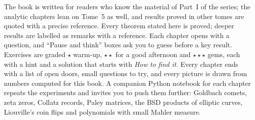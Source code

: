 The book is written for readers who know the material of Part~I of the series; the analytic chapters lean on
Tome~5 as well, and results proved in other tomes are quoted with a precise reference. Every theorem stated here
is proved; deeper results are labelled as remarks with a reference. Each chapter opens with a question, and
``Pause and think'' boxes ask you to guess before a key result. Exercises are graded \textbf{$\star$} warm-up,
\textbf{$\star\star$} for a good afternoon and \textbf{$\star\star\star$} gems, each with a hint and a solution
that starts with \emph{How to find it}. Every chapter ends with a list of open doors, small questions to try,
and every picture is drawn from numbers computed for this book. A companion Python notebook for each chapter
repeats the experiments and invites you to push them further: Goldbach comets, zeta zeros, Collatz records,
Paley matrices, the BSD products of elliptic curves, Liouville's coin flips and polynomials with small Mahler
measure.

